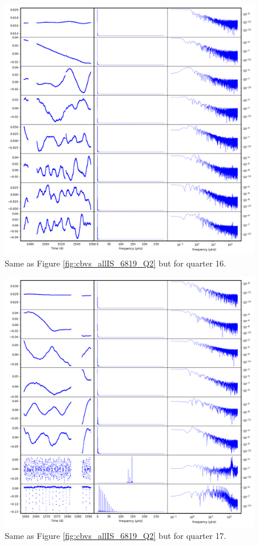 \begin{figure}
    \centering
    \includegraphics[width=\linewidth]{Chapter_Appended/AppB/cbv_6819_q16.png}
    \caption{Same as Figure \ref{fig:cbvs_allIS_6819_Q2} but for quarter 16.}
    \label{fig:cbvs_allIS_6819_Q16}
\end{figure}


\begin{figure}
    \centering
    \includegraphics[width=\linewidth]{Chapter_Appended/AppB/cbv_6819_q17.png}
    \caption{Same as Figure \ref{fig:cbvs_allIS_6819_Q2} but for quarter 17.}
    \label{fig:cbvs_allIS_6819_Q17}
\end{figure}


